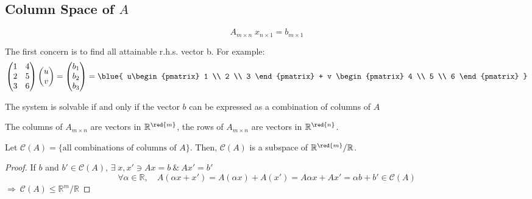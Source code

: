 \newpage

\subsection{Column Space of $A$}

\begin{eg}
    \[
    A_{m\times n}\; x_{n\times 1} = b_{m\times1}
    \]
\end{eg}
The first concern is to find all attainable r.h.s. vector b. For example: 
\[
\begin{pmatrix}
    1 & 4 \\
    2 & 5 \\
    3 & 6
\end{pmatrix} \begin{pmatrix}
    u \\v
\end{pmatrix} = \begin{pmatrix}
    b_1 \\ b_2 \\ b_3
\end{pmatrix} = \blue{
    u\begin{pmatrix}
        1 \\ 2 \\ 3
    \end{pmatrix} + v \begin{pmatrix}
        4 \\ 5 \\ 6
    \end{pmatrix} 
}
\]

\begin{theorem}
    The system is solvable if and only if the vector $b$ can be expressed as a combination of columns of $A$
\end{theorem}

\begin{note}
The columns of $A_{m\times n}$ are vectors in $\mathbb{R}^{\red{m}}$, the rows of $A_{m\times n}$ are vectors in $\mathbb{R}^{\red{n}}$. 
\end{note}

\begin{eg}
Let $\mathcal{C}(A) = \{ \text{all combinations of columns of } A \}$. Then, $\mathcal{C}(A)$ is a subspace of $\mathbb{R}^{\red{m}}/\mathbb{R}$.
\end{eg}
\begin{proof}
    If $b$ and $b' \in \mathcal{C}(A)$, $\exists \; x, x' \ni Ax = b\ \& \ Ax' = b'$
    \[
        \forall \alpha \in \mathbb{R}, \quad A(\alpha x + x') = A(\alpha x) + A(x') = A \alpha x + Ax' = \alpha b + b' \in \mathcal{C}(A)
    \]
    $\Longrightarrow\ \mathcal{C}(A) \leq \mathbb{R}^m/\mathbb{R}$
\end{proof}

